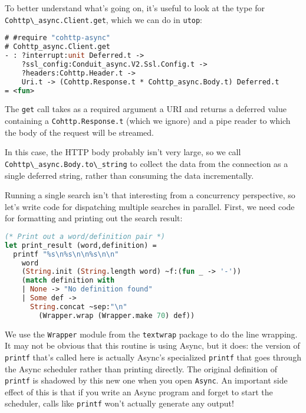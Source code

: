 To better understand what's going on, it's useful to look at the type
for \passthrough{\lstinline!Cohttp\_async.Client.get!}, which we can do
in \passthrough{\lstinline!utop!}:

\begin{lstlisting}[language=Caml]
# #require "cohttp-async"
# Cohttp_async.Client.get
- : ?interrupt:unit Deferred.t ->
    ?ssl_config:Conduit_async.V2.Ssl.Config.t ->
    ?headers:Cohttp.Header.t ->
    Uri.t -> (Cohttp.Response.t * Cohttp_async.Body.t) Deferred.t
= <fun>
\end{lstlisting}

The \passthrough{\lstinline!get!} call takes as a required argument a
URI and returns a deferred value containing a
\passthrough{\lstinline!Cohttp.Response.t!} (which we ignore) and a pipe
reader to which the body of the request will be streamed.

In this case, the HTTP body probably isn't very large, so we call
\passthrough{\lstinline!Cohttp\_async.Body.to\_string!} to collect the
data from the connection as a single deferred string, rather than
consuming the data incrementally.

Running a single search isn't that interesting from a concurrency
perspective, so let's write code for dispatching multiple searches in
parallel. First, we need code for formatting and printing out the search
result:

\begin{lstlisting}[language=Caml]
(* Print out a word/definition pair *)
let print_result (word,definition) =
  printf "%s\n%s\n\n%s\n\n"
    word
    (String.init (String.length word) ~f:(fun _ -> '-'))
    (match definition with
    | None -> "No definition found"
    | Some def ->
      String.concat ~sep:"\n"
        (Wrapper.wrap (Wrapper.make 70) def))
\end{lstlisting}

We use the \passthrough{\lstinline!Wrapper!} module from the
\passthrough{\lstinline!textwrap!} package to do the line wrapping. It
may not be obvious that this routine is using Async, but it does: the
version of \passthrough{\lstinline!printf!} that's called here is
actually Async's specialized \passthrough{\lstinline!printf!} that goes
through the Async scheduler rather than printing directly. The original
definition of \passthrough{\lstinline!printf!} is shadowed by this new
one when you open \passthrough{\lstinline!Async!}. An important side
effect of this is that if you write an Async program and forget to start
the scheduler, calls like \passthrough{\lstinline!printf!} won't
actually generate any output!

